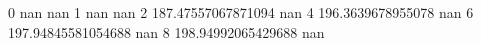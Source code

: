 0 nan nan
1 nan nan
2 187.47557067871094 nan
4 196.3639678955078 nan
6 197.94845581054688 nan
8 198.94992065429688 nan
